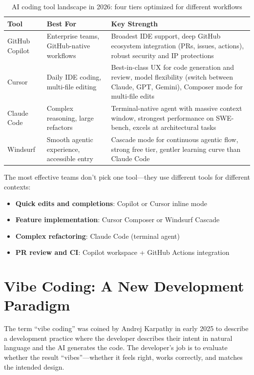\begin{table}[htbp]
\centering
\caption{AI coding tool landscape in 2026: four tiers optimized for different workflows}
\label{tab:ai-tools}
\begin{tabularx}{\textwidth}{p{2.2cm}p{2.5cm}X}
\toprule
\textbf{Tool} & \textbf{Best For} & \textbf{Key Strength} \\
\midrule
GitHub Copilot & Enterprise teams, GitHub-native workflows & Broadest IDE support, deep GitHub ecosystem integration (PRs, issues, actions), robust security and IP protections \\
\midrule
Cursor & Daily IDE coding, multi-file editing & Best-in-class UX for code generation and review, model flexibility (switch between Claude, GPT, Gemini), Composer mode for multi-file edits \\
\midrule
Claude Code & Complex reasoning, large refactors & Terminal-native agent with massive context window, strongest performance on SWE-bench, excels at architectural tasks \\
\midrule
Windsurf & Smooth agentic experience, accessible entry & Cascade mode for continuous agentic flow, strong free tier, gentler learning curve than Claude Code \\
\bottomrule
\end{tabularx}
\end{table}

\begin{tipbox}
The most effective teams don't pick one tool---they use different tools for different contexts:
\begin{itemize}
    \item \textbf{Quick edits and completions}: Copilot or Cursor inline mode
    \item \textbf{Feature implementation}: Cursor Composer or Windsurf Cascade
    \item \textbf{Complex refactoring}: Claude Code (terminal agent)
    \item \textbf{PR review and CI}: Copilot workspace + GitHub Actions integration
\end{itemize}
\end{tipbox}

\section{Vibe Coding: A New Development Paradigm}

The term ``vibe coding'' was coined by Andrej Karpathy in early 2025 to describe a development practice where the developer describes their intent in natural language and the AI generates the code. The developer's job is to evaluate whether the result ``vibes''---whether it feels right, works correctly, and matches the intended design.

